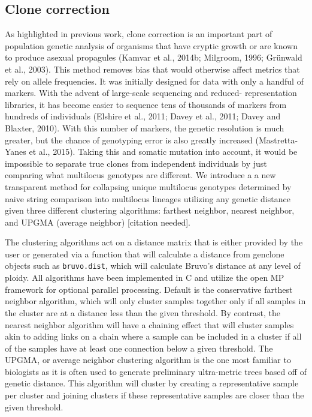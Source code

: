 \documentclass{frontiersSCNS} %
\begin{document}
\subsection*{Clone correction}\label{clone-correction}

As highlighted in previous work, clone correction is an important part
of population genetic analysis of organisms that have cryptic growth or
are known to produce asexual propagules (Kamvar et al., 2014b; Milgroom,
1996; Grünwald et al., 2003). This method removes bias that would
otherwise affect metrics that rely on allele frequencies. It was
initially designed for data with only a handful of markers. With the
advent of large-scale sequencing and reduced- representation libraries,
it has become easier to sequence tens of thousands of markers from
hundreds of individuals (Elshire et al., 2011; Davey et al., 2011; Davey
and Blaxter, 2010). With this number of markers, the genetic resolution
is much greater, but the chance of genotyping error is also greatly
increased (Mastretta-Yanes et al., 2015). Taking this and somatic
mutation into account, it would be impossible to separate true clones
from independent individuals by just comparing what multilocus genotypes
are different. We introduce a a new transparent method for collapsing
unique multilocus genotypes determined by naive string comparison into
multilocus lineages utilizing any genetic distance given three different
clustering algorithms: farthest neighbor, nearest neighbor, and UPGMA
(average neighbor) {[}citation needed{]}.

The clustering algorithms act on a distance matrix that is either
provided by the user or generated via a function that will calculate a
distance from genclone objects such as \texttt{bruvo.dist}, which will
calculate Bruvo's distance at any level of ploidy. All algorithms have
been implemented in C and utilize the open MP framework for optional
parallel processing. Default is the conservative farthest neighbor
algorithm, which will only cluster samples together only if all samples
in the cluster are at a distance less than the given threshold. By
contrast, the nearest neighbor algorithm will have a chaining effect
that will cluster samples akin to adding links on a chain where a sample
can be included in a cluster if all of the samples have at least one
connection below a given threshold. The UPGMA, or average neighbor
clustering algorithm is the one most familiar to biologists as it is
often used to generate preliminary ultra-metric trees based off of
genetic distance. This algorithm will cluster by creating a
representative sample per cluster and joining clusters if these
representative samples are closer than the given threshold.
\end{document}
